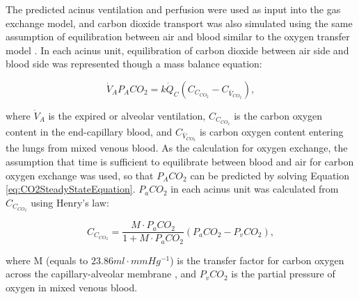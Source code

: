 The predicted acinus ventilation and perfusion were used as input into the gas exchange model, and carbon dioxide transport was also simulated using the same assumption of equilibration between air and blood similar to the oxygen transfer model \citep{kapitan1986computer}. In each acinus unit, equilibration of carbon dioxide between air side and blood side was represented though a mass balance equation:

\begin{equation} 
 \label{eq:CO2SteadyStateEquation}
 \dot{V}_A P_ACO_2 = k\dot{Q}_C(C_{C_{CO_2}} - C_{\bar{V}_{CO_2}}),
\end{equation}

\noindent where $\dot{V}_A$ is the expired or alveolar ventilation, $C_{C_{CO_2}}$ is the carbon oxygen content in the end-capillary blood, and $C_{\bar{V}_{CO_2}}$ is carbon oxygen content entering the lungs from mixed venous blood. As the calculation for oxygen exchange, the assumption that time is sufficient to equilibrate between blood and air for carbon oxygen exchange was used, so that $P_ACO_2$ can be predicted by solving Equation \ref{eq:CO2SteadyStateEquation}. $P_aCO_2$ in each acinus unit was calculated from $C_{C_{CO_2}}$ using Henry’s law:

\begin{equation} 
 \label{eq:CarbonOxygenContent}
 C_{C_{CO_2}} = \frac{M \cdot P_aCO_2}{1+M \cdot P_aCO_2}(P_aCO_2 - P_vCO_2),
\end{equation}

\noindent where M (equals to $23.86 ml \cdot mmHg^{-1}$) is the transfer factor for carbon oxygen across the capillary-alveolar membrane \citep{chakraborty2004diffusing}, and $P_vCO_2$ is the partial pressure of oxygen in mixed venous blood.

